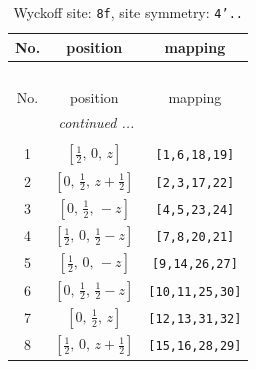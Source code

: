 \documentclass[fleqn,8pt]{jsarticle}
\begin{document}
\begin{longtable}{ccc}
\caption{Wyckoff site: {\tt 8f}, site symmetry: {\tt 4'..}}
 \\
 \hline \hline
No. & position & mapping \\ \hline \endfirsthead

\multicolumn{2}{l}{\tablename\ \thetable{}} \\
 \hline \hline
No. & position & mapping \\ \hline \endhead

 \hline \hline
\multicolumn{2}{r}{\footnotesize\it continued ...} \\ \endfoot

 \hline \hline
\multicolumn{2}{r}{} \\ \endlastfoot

1 & $\left[ \frac{1}{2},\, 0,\, z \right]$ & {\tt [1,6,18,19]} \\ \hline
2 & $\left[ 0,\, \frac{1}{2},\, z + \frac{1}{2} \right]$ & {\tt [2,3,17,22]} \\ \hline
3 & $\left[ 0,\, \frac{1}{2},\, - z \right]$ & {\tt [4,5,23,24]} \\ \hline
4 & $\left[ \frac{1}{2},\, 0,\, \frac{1}{2} - z \right]$ & {\tt [7,8,20,21]} \\ \hline
5 & $\left[ \frac{1}{2},\, 0,\, - z \right]$ & {\tt [9,14,26,27]} \\ \hline
6 & $\left[ 0,\, \frac{1}{2},\, \frac{1}{2} - z \right]$ & {\tt [10,11,25,30]} \\ \hline
7 & $\left[ 0,\, \frac{1}{2},\, z \right]$ & {\tt [12,13,31,32]} \\ \hline
8 & $\left[ \frac{1}{2},\, 0,\, z + \frac{1}{2} \right]$ & {\tt [15,16,28,29]} \\
\end{longtable}
\renewcommand{\arraystretch}{1.2}
\end{document}

